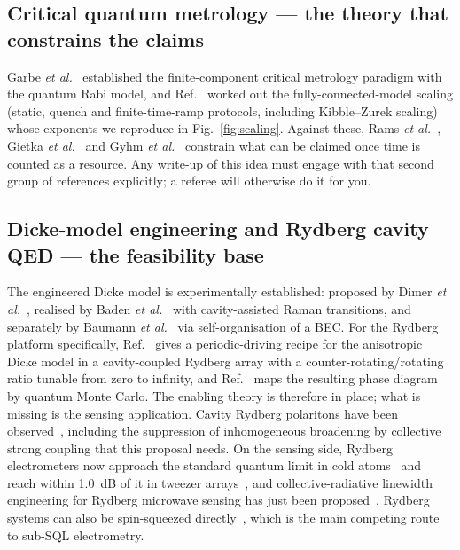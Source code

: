 \documentclass[11pt,a4paper]{article}
\begin{document}
\subsection{Critical quantum metrology --- the theory that constrains the claims}

Garbe \emph{et al.}~\cite{Garbe2020} established the finite-component critical metrology
paradigm with the quantum Rabi model, and Ref.~\cite{Garbe2022} worked out the
fully-connected-model scaling (static, quench and finite-time-ramp protocols, including
Kibble--Zurek scaling) whose exponents we reproduce in Fig.~\ref{fig:scaling}. Against these,
Rams \emph{et al.}~\cite{Rams2018}, Gietka \emph{et al.}~\cite{Gietka2021,Gietka2022} and
Gyhm \emph{et al.}~\cite{Gyhm2025} constrain what can be claimed once time is counted as a
resource. Any write-up of this idea must engage with that second group of references
explicitly; a referee will otherwise do it for you.

\subsection{Dicke-model engineering and Rydberg cavity QED --- the feasibility base}

The engineered Dicke model is experimentally established: proposed by Dimer \emph{et
al.}~\cite{Dimer2007}, realised by Baden \emph{et al.}~\cite{Baden2014} with cavity-assisted
Raman transitions, and separately by Baumann \emph{et al.}~\cite{Baumann2010} via
self-organisation of a BEC. For the Rydberg platform specifically,
Ref.~\cite{Anisotropic2025} gives a periodic-driving recipe for the anisotropic Dicke model
in a cavity-coupled Rydberg array with a counter-rotating/rotating ratio tunable from zero
to infinity, and Ref.~\cite{DickeIsing2025} maps the resulting phase diagram by quantum
Monte Carlo. The enabling theory is therefore in place; what is missing is the sensing
application. Cavity Rydberg polaritons have been observed~\cite{Ningyuan2016},
including the suppression of inhomogeneous broadening by collective strong coupling that this
proposal needs. On the sensing side, Rydberg electrometers now approach the standard quantum
limit in cold atoms~\cite{SciAdv2024} and reach within 1.0~dB of it in tweezer
arrays~\cite{PRL2026}, and collective-radiative linewidth engineering for Rydberg microwave
sensing has just been proposed~\cite{PRA2026}. Rydberg systems can also be spin-squeezed
directly~\cite{Bloqade2023}, which is the main competing route to sub-SQL electrometry.
\end{document}
